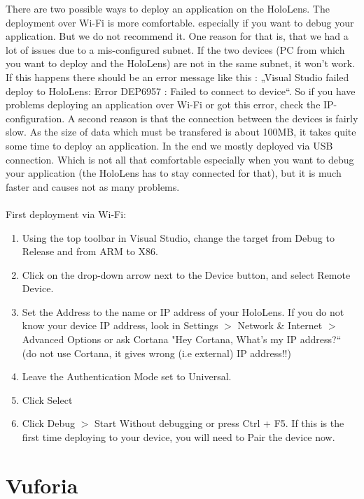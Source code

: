 There are two possible ways to deploy an application on the HoloLens. The deployment over Wi-Fi is more comfortable. especially if you want to debug your application. But we do not recommend it. One reason for that is, that we had a lot of issues due to a mis-configured subnet. If the two devices (PC from which you want to deploy and the HoloLens) are not in the same subnet, it won't work. If this happens there should be an error message like this : „Visual Studio failed deploy to HoloLens: Error DEP6957 : Failed to connect to device“. So if you have problems deploying an application over Wi-Fi or got this error, check the IP-configuration. A second reason is that the connection between the devices is fairly slow. As the size of data which must be transfered is about 100MB, it takes quite some time to deploy an application. In the end we mostly deployed via USB connection. Which is not all that comfortable especially when you want to debug your application (the HoloLens has to stay connected for that), but it is much faster and causes not as many problems.
\\
\\
First deployment via Wi-Fi:
\begin{enumerate}
\item Using the top toolbar in Visual Studio, change the target from Debug to Release and from ARM to X86.
\item Click on the drop-down arrow next to the Device button, and select Remote Device.
\item Set the Address to the name or IP address of your HoloLens. If you do not know your device IP address, look in Settings $>$ Network \& Internet $>$ Advanced Options or ask Cortana "Hey Cortana, What's my IP address?“ (do not use Cortana, it gives wrong (i.e external) IP address!!)
\item Leave the Authentication Mode set to Universal.
\item Click Select
\item Click Debug $>$ Start Without debugging or press Ctrl + F5. If this is the first time deploying to your device, you will need to Pair the device now.
\end{enumerate}

\section{Vuforia}

